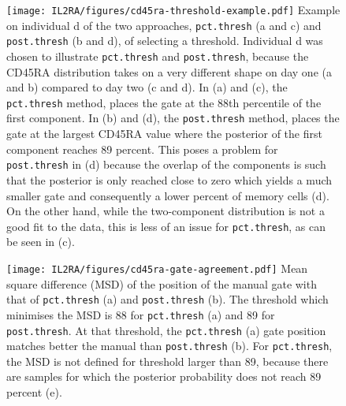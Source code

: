 \begin{figure}[h]
\centering
  \texttt{[image: IL2RA/figures/cd45ra-threshold-example.pdf]}
{ Example on individual d of the two approaches, \texttt{pct.thresh} (a and c) and \texttt{post.thresh} (b and d), of selecting a threshold. }
{
  Individual d was chosen to illustrate \texttt{pct.thresh} and \texttt{post.thresh}, because
  the CD45RA distribution takes on a very different shape on day one (a and b) compared to day two (c and d).
  In (a) and (c), the \texttt{pct.thresh} method, places the gate at the 88th percentile of the first component.
  In (b) and (d), the \texttt{post.thresh} method, places the gate at the largest CD45RA value where the posterior of the first component reaches 89 percent.
  This poses a problem for \texttt{post.thresh} in (d) because the overlap of the components is such that the posterior is only reached close to zero
  which yields a much smaller gate and consequently a lower percent of memory cells (d).
  On the other hand, while the two-component distribution is not a good fit to the data, this is less of an issue for \texttt{pct.thresh}, as can be seen in (c).
}
\end{figure}



\begin{figure}[h]
\centering
  \texttt{[image: IL2RA/figures/cd45ra-gate-agreement.pdf]}
{ Mean square difference (MSD) of the position of the manual gate with that of \texttt{pct.thresh} (a) and \texttt{post.thresh} (b). }
{
  The threshold which minimises the MSD is 88 for \texttt{pct.thresh} (a) and 89 for \texttt{post.thresh}.
  At that threshold, the \texttt{pct.thresh} (a) gate position matches better the manual than \texttt{post.thresh} (b).
  For \texttt{pct.thresh}, the MSD is not defined for threshold larger than 89,
  because there are samples for which the posterior probability does not reach 89 percent (e).
}
\end{figure}


